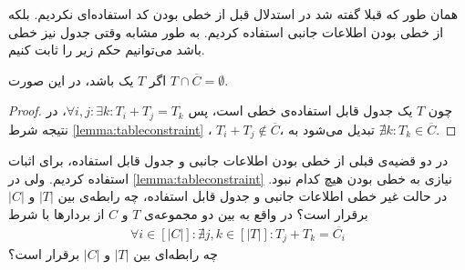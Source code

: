 همان طور که قبلا گفته شد در استدلال قبل از خطی بودن کد استفاده‌ای نکردیم. بلکه از خطی بودن اطلاعات جانبی استفاده کردیم. به طور مشابه وقتی جدول نیز خطی باشد می‌توانیم حکم زیر را ثابت کنیم.
\begin{theorem}
	اگر 
	$T$
	یک 
	باشد، در این صورت
	$T \cap \overline{C} = \emptyset$.
\end{theorem}
\begin{proof}
	چون
	$T$
	یک جدول قابل استفاده‌ی خطی است، پس
	$\forall i, j: \exists k: T_i + T_j = T_k$،
	در نتیجه شرط
	\autoref{lemma:tableconstraint}
	،
	$T_i + T_j \notin \overline{C}$،
	تبدیل می‌شود به
	$\nexists k: T_k \in \overline{C}$.
\end{proof}

\begin{openproblem}
	در دو قضیه‌ی قبلی از خطی بودن اطلاعات جانبی و جدول قابل استفاده، برای اثبات استفاده کردیم. ولی در
	\autoref{lemma:tableconstraint}
	نیازی به خطی بودن هیچ کدام نبود. در حالت غیر خطی اطلاعات جانبی و جدول قابل استفاده، چه رابطه‌ی بین
	$|T|$
	و
	$|C|$
	برقرار است؟ در واقع به بین دو مجموعه‌ی
	$T$
	و
	$C$
	 از بردارها با شرط
 	\begin{align}
	 	\forall i \in [|C|]: \nexists j, k \in [|T|]: T_j + T_k = \overline{C_i}
	 \end{align}
	 چه رابطه‌ای بین
	 	$|T|$
	 و
	 $|C|$
	 برقرار است؟
\end{openproblem}














